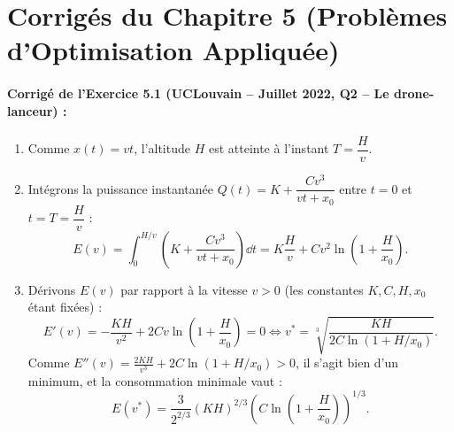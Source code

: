 \section{Corrigés du Chapitre 5 (Problèmes d'Optimisation Appliquée)}

\paragraph{Corrigé de l'Exercice 5.1 (UCLouvain -- Juillet 2022, Q2 -- Le drone-lanceur) :}
\begin{enumerate}[label=(\alph*)]
    \item Comme $x(t) = vt$, l'altitude $H$ est atteinte à l'instant $\boxed{T = \dfrac{H}{v}}$.
    \item Intégrons la puissance instantanée $Q(t) = K + \dfrac{Cv^3}{vt + x_0}$ entre $t = 0$ et $t = T = \dfrac{H}{v}$ :
    \[
        E(v) = \int_0^{H/v} \left(K + \frac{Cv^3}{vt + x_0}\right)\dd t = \boxed{K\frac{H}{v} + Cv^2\ln\left(1 + \frac{H}{x_0}\right)}.
    \]
    \item Dérivons $E(v)$ par rapport à la vitesse $v > 0$ (les constantes $K, C, H, x_0$ étant fixées) :
    \[
        E'(v) = -\frac{KH}{v^2} + 2Cv\ln\left(1 + \frac{H}{x_0}\right) = 0 \iff \boxed{v^* = \sqrt[3]{\frac{KH}{2C\ln(1 + H/x_0)}}}.
    \]
    Comme $E''(v) = \frac{2KH}{v^3} + 2C\ln(1+H/x_0) > 0$, il s'agit bien d'un minimum, et la consommation minimale vaut :
    \[
        \boxed{E(v^*) = \frac{3}{2^{2/3}}(KH)^{2/3}\left(C\ln\left(1 + \frac{H}{x_0}\right)\right)^{1/3}}.
    \]
\end{enumerate}

